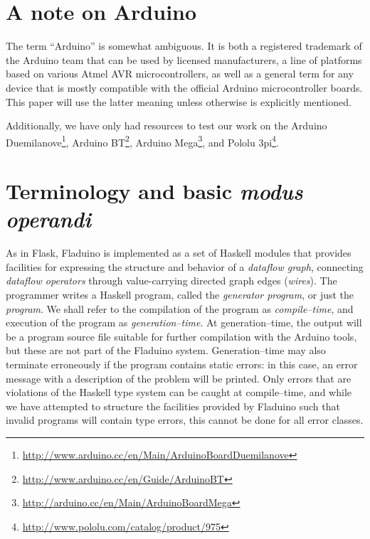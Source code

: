 \documentclass[a4paper, oneside, draft]{memoir}
\begin{document}
\section{A note on Arduino}

The term ``Arduino'' is somewhat ambiguous.  It is both a registered
trademark of the Arduino team that can be used by licensed
manufacturers, a line of platforms based on various Atmel AVR
microcontrollers, as well as a general term for any device that is
mostly compatible with the official Arduino microcontroller boards.
This paper will use the latter meaning unless otherwise is explicitly
mentioned.

Additionally, we have only had resources to test our work on the
Arduino
Duemilanove\footnote{\url{http://www.arduino.cc/en/Main/ArduinoBoardDuemilanove}},
Arduino BT\footnote{\url{http://www.arduino.cc/en/Guide/ArduinoBT}},
Arduino
Mega\footnote{\url{http://arduino.cc/en/Main/ArduinoBoardMega}},
and Pololu 3pi\footnote{\url{http://www.pololu.com/catalog/product/975}}.

\section{Terminology and basic \textit{modus operandi}}

As in Flask, Fladuino is implemented as a set of Haskell modules that
provides facilities for expressing the structure and behavior of a
\textit{dataflow graph}, connecting \textit{dataflow operators}
through value-carrying directed graph edges (\textit{wires}).  The
programmer writes a Haskell program, called the \textit{generator
  program}, or just the \textit{program}.  We shall refer to the
compilation of the program as \textit{compile--time}, and execution of
the program as \textit{generation--time}.  At generation--time, the
output will be a program source file suitable for further compilation
with the Arduino tools, but these are not part of the Fladuino system.
Generation--time may also terminate erroneously if the program
contains static errors: in this case, an error message with a
description of the problem will be printed.  Only errors that are
violations of the Haskell type system can be caught at compile--time,
and while we have attempted to structure the facilities provided by
Fladuino such that invalid programs will contain type errors, this
cannot be done for all error classes.

\end{document}
